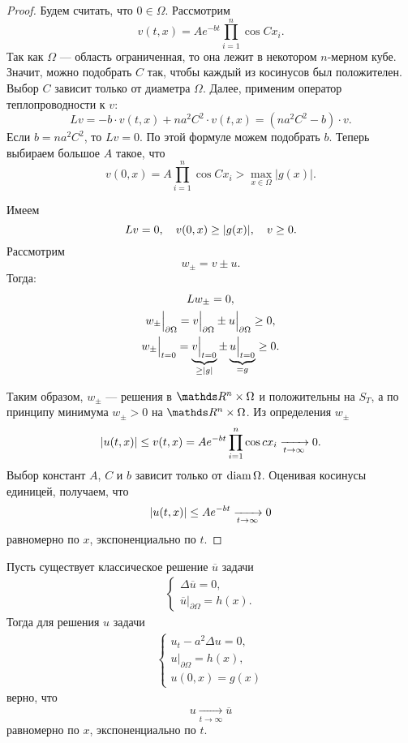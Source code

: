 \begin{proof}
Будем считать, что $0 \in \Omega$. Рассмотрим
$$ v(t,x) = A e^{-bt} \prod \limits_{i=1}^n \cos C x_i. $$
Так как $\Omega$ --- область ограниченная, то она лежит в некотором $n$-мерном кубе. Значит, можно подобрать $C$ так, чтобы каждый из косинусов был положителен. Выбор $C$ зависит только от диаметра $\Omega$. Далее, применим оператор теплопроводности к $v$:
$$ Lv = -b \cdot v(t,x) + n a^2 C^2 \cdot v(t,x) = (na^2C^2 - b) \cdot v.$$
Если $b = n a^2 C^2$, то $Lv = 0$. По этой формуле можем подобрать $b$. Теперь выбираем большое $A$ такое, что
$$ v(0,x) = A \prod \limits_{i=1}^n \cos C x_i > \max_{x \in \Omega} |g(x)|.$$

Имеем $$Lv = 0,\quad v(0,x) \geq \lvert g(x)\rvert,\quad v \geq 0 .$$ Рассмотрим
$$ w_{\pm} = v \pm u.$$
Тогда:
\begin{gather*}
	Lw_{\pm} = 0, \\
	w_{\pm}\Big\rvert_{\partial \Omega} = v\Big\rvert_{\partial \Omega} \pm u\Big\rvert_{\partial \Omega} \geq 0, \\
	w_{\pm}\Big\rvert_{t=0} = \underbrace {v\Big\rvert_{t=0}}_{\geq \lvert g\rvert} \pm \underbrace{u\Big\rvert_{t=0}}_{=g} \geq 0.
\end{gather*}

Таким образом, $w_{\pm}$ --- решения в $\real^n \times \Omega$ и положительны на $S_T$, а по принципу минимума $w_{\pm} > 0$  на $\real^n \times \Omega$. Из определения $w_{\pm}$ 
$$\lvert u(t,x)\rvert \leq v(t,x) = A e^{-bt} \prod \limits_{i=1}^n \cos c x_i \xrightarrow[t \to \infty]{} 0.$$
Выбор констант $A$, $C$ и $b$ зависит только от $\operatorname{diam} \Omega$. Оценивая косинусы единицей, получаем, что
$$ \lvert u(t,x)\rvert \leq A e^{-bt} \xrightarrow[t \to \infty]{} 0$$
равномерно по $x$, экспоненциально по $t$.

\end{proof}


\begin{note} Пусть существует классическое решение $\overline{u}$ задачи
\begin{gather*}
	\begin{cases*}
		\Delta \overline{u} = 0, \\
		\overline{u}\Big\rvert_{\partial \Omega} = h(x).
	\end{cases*}
\end{gather*}
Тогда для решения $u$ задачи 
\begin{gather*}
	\begin{cases*}
		u_t - a^2 \Delta u = 0, \\
		u \Big\rvert_{\partial \Omega} = h(x), \\
		u(0, x) = g(x)
	\end{cases*}
\end{gather*}
верно, что $$u \xrightarrow[t \to \infty]{} \overline{u}$$
равномерно по $x$, экспоненциально по $t$.
\end{note}

